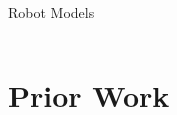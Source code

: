 \documentclass{beamer}
\begin{document}
\begin{frame}{Robot Models}
\begin{itemize}
\begin{columns}
			
		\end{columns} 
	\end{itemize}
\end{frame}


\section{Prior Work} 
\end{document}

